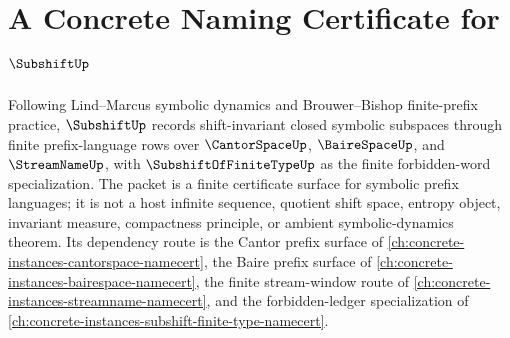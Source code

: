 \chapter{A Concrete Naming Certificate for $\SubshiftUp$}
\label{ch:concrete-instances-subshift-namecert}

Following Lind--Marcus symbolic dynamics and Brouwer--Bishop finite-prefix practice, $\SubshiftUp$ records shift-invariant closed symbolic subspaces through finite prefix-language rows over $\CantorSpaceUp$, $\BaireSpaceUp$, and $\StreamNameUp$, with $\SubshiftOfFiniteTypeUp$ as the finite forbidden-word specialization. The packet is a finite certificate surface for symbolic prefix languages; it is not a host infinite sequence, quotient shift space, entropy object, invariant measure, compactness principle, or ambient symbolic-dynamics theorem. Its dependency route is the Cantor prefix surface of \autoref{ch:concrete-instances-cantorspace-namecert}, the Baire prefix surface of \autoref{ch:concrete-instances-bairespace-namecert}, the finite stream-window route of \autoref{ch:concrete-instances-streamname-namecert}, and the forbidden-ledger specialization of \autoref{ch:concrete-instances-subshift-finite-type-namecert}.

